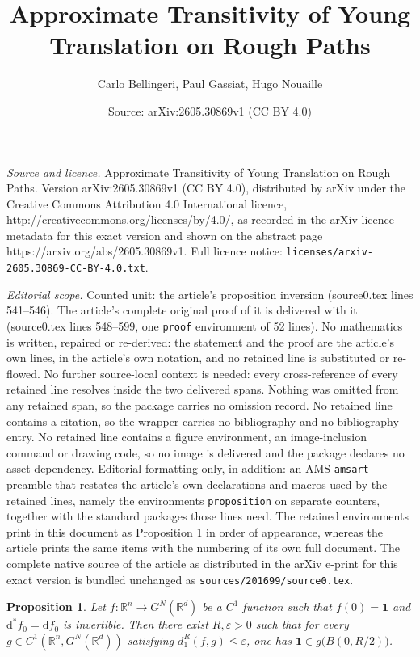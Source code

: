 \documentclass[10pt,a4paper]{amsart}
\title{Approximate Transitivity of Young Translation on Rough Paths}
\author{Carlo Bellingeri, Paul Gassiat, Hugo Nouaille}
\date{Source: arXiv:2605.30869v1 (CC BY 4.0)}
\newtheorem{proposition}{Proposition}
\begin{document}
\maketitle

\noindent\emph{Source and licence.} Approximate Transitivity of Young Translation on Rough Paths. Version arXiv:2605.30869v1 (CC BY 4.0), distributed by arXiv under the Creative Commons Attribution 4.0 International licence, http://creativecommons.org/licenses/by/4.0/, as recorded in the arXiv licence metadata for this exact version and shown on the abstract page https://arxiv.org/abs/2605.30869v1. Full licence notice: \texttt{licenses/arxiv-2605.30869-CC-BY-4.0.txt}.\par\smallskip

\noindent\textit{Editorial scope.} Counted unit: the article's proposition inversion (source0.tex lines 541--546). The article's complete original proof of it is delivered with it (source0.tex lines 548--599, one \texttt{proof} environment of 52 lines). No mathematics is written, repaired or re-derived: the statement and the proof are the article's own lines, in the article's own notation, and no retained line is substituted or re-flowed.  No further source-local context is needed: every cross-reference of every retained line resolves inside the two delivered spans.  Nothing was omitted from any retained span, so the package carries no omission record.  No retained line contains a citation, so the wrapper carries no bibliography and no bibliography entry.  No retained line contains a figure environment, an image-inclusion command or drawing code, so no image is delivered and the package declares no asset dependency.  Editorial formatting only, in addition: an AMS \texttt{amsart} preamble that restates the article's own declarations and macros used by the retained lines, namely the environments \texttt{proposition} on separate counters, together with the standard packages those lines need.  The retained environments print in this document as Proposition 1 in order of appearance, whereas the article prints the same items with the numbering of its own full document.  The complete native source of the article as distributed in the arXiv e-print for this exact version is bundled unchanged as \texttt{sources/201699/source0.tex}.
\begin{proposition}\label{inversion}
Let $f\colon \mathbb{R}^n \to G^N(\mathbb{R}^d)$ be a $C^1$ function such that
$f(0)=\mathbf{1}$ and $\mathrm{d}^* f_0=\mathrm{d}f_0$ is invertible. Then there exist $R,\varepsilon>0$ such that for every $g \in C^1(\mathbb{R}^n,G^N(\mathbb{R}^d))$ satisfying
$ d_1^R(f,g) \le \varepsilon$,
one has $\mathbf{1}\in g\big(B(0,R/2)\big)$.
\end{proposition}
\end{document}
